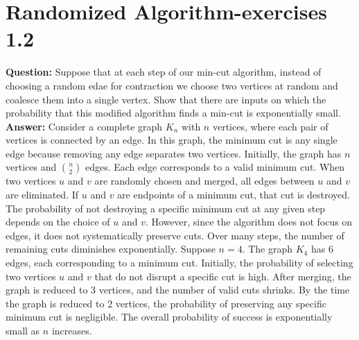 \documentclass[12pt]{article}
\begin{document}
\section{Randomized Algorithm-exercises 1.2}
\textbf{Question:}
Suppose that at each step of our min-cut algorithm, instead of choosing a random edae for contraction we choose two vertices at random and coalesce them into a single vertex. Show that there are inputs on which the probability that this modified algorithm finds a min-cut is exponentially small.\\
\textbf{Answer:}
Consider a complete graph \( K_n \) with \( n \) vertices, where each pair of vertices is connected by an edge. In this graph, the minimum cut is any single edge because removing any edge separates two vertices. Initially, the graph has \( n \) vertices and \( \binom{n}{2} \) edges. Each edge corresponds to a valid minimum cut. When two vertices \( u \) and \( v \) are randomly chosen and merged, all edges between \( u \) and \( v \) are eliminated. If \( u \) and \( v \) are endpoints of a minimum cut, that cut is destroyed. The probability of not destroying a specific minimum cut at any given step depends on the choice of \( u \) and \( v \). However, since the algorithm does not focus on edges, it does not systematically preserve cuts. Over many steps, the number of remaining cuts diminishes exponentially. Suppose \( n = 4 \). The graph \( K_4 \) has 6 edges, each corresponding to a minimum cut. Initially, the probability of selecting two vertices \( u \) and \( v \) that do not disrupt a specific cut is high. After merging, the graph is reduced to 3 vertices, and the number of valid cuts shrinks. By the time the graph is reduced to 2 vertices, the probability of preserving any specific minimum cut is negligible. The overall probability of success is exponentially small as \( n \) increases.
\end{document}
